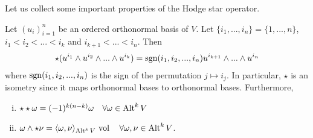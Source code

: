 \documentclass[../master_thesis.tex]{subfiles}
\begin{document}
Let us collect some important properties of the Hodge star operator.
\begin{proposition}\label{prop:properties_hodge_star}
    Let $(u_i)_{i=1}^n$ be an ordered orthonormal basis of $V$. Let 
    $\{ i_1, ..., i_n \} = \{ 1, ..., n\}$, $i_1 < i_2 < ... < i_k$ and 
    $i_{k+1} < ... < i_n$. Then
    \begin{align}
        \star (u^{i_1} \wedge u^{i_2} \wedge ... \wedge u^{i_k})
        = \operatorname{sgn}(i_1,i_2,...,i_n) u^{i_{k+1}} \wedge ... \wedge u^{i_{n}}
        \label{eq:hodge_star_orthonormal_basis}
    \end{align}
    where $\operatorname{sgn}(i_1,i_2,...,i_n)$ 
    is the sign of the permutation $j \mapsto i_j$. In particular, 
    $\star$ is an isometry since it maps orthonormal bases to orthonormal 
    bases. Furthermore,
    \begin{enumerate}[(i)]
        \item $\star \star \omega = (-1)^{k(n-k)} \omega \quad \forall \omega 
            \in {\text{Alt}^{k}\,V}$
        \item $\omega \wedge \star \nu = \langle \omega, \nu \rangle
            _{{\text{Alt}^{k}\,V}}  \, \operatorname{vol} \quad \forall \omega, \nu \in {\text{Alt}^{k}\,V}$.     
    \end{enumerate}
\end{proposition}
\end{document}
